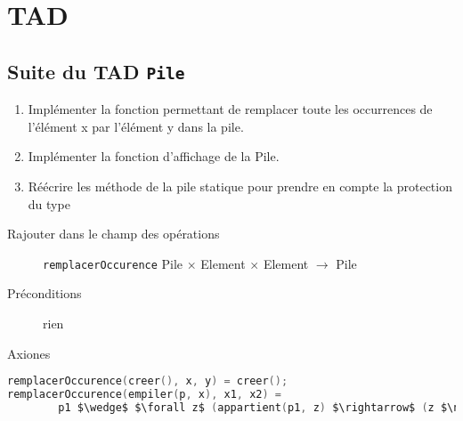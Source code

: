 \section{TAD}
\subsection{Suite du TAD \texttt{Pile}}
\begin{enumerate}
	\item Implémenter la fonction permettant de remplacer toute les occurrences de l'élément x par l'élément y dans la pile.
	\item Implémenter la fonction d'affichage de la Pile.
	\item Réécrire les méthode de la pile statique pour prendre en compte la protection du type
\end{enumerate}
\begin{description}
	\item[Rajouter dans le champ des opérations] \texttt{remplacerOccurence} Pile $\times$ Element $\times$ Element $\rightarrow$ Pile
	\item[Préconditions] rien
	\item[Axiones]
\end{description}

\begin{lstlisting}[language=C]
remplacerOccurence(creer(), x, y) = creer();
remplacerOccurence(empiler(p, x), x1, x2) = 
		p1 $\wedge$ $\forall z$ (appartient(p1, z) $\rightarrow$ (z $\neq$ x1) (empiler(p, x), z') $\wedge$ z' = x1))
\end{lstlisting}



